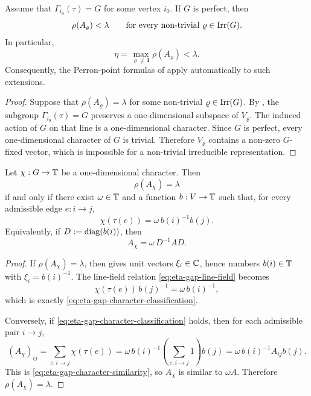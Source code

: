 \begin{corollary}
  \label{cor:eta-gap-perfect-group}
  Assume that \(\Gamma_{i_0}(\tau)=G\) for some vertex \(i_0\). If
  \(G\) is perfect, then
  \[
    \rho(A_\varrho)<\lambda
    \qquad
    \text{for every non-trivial } \varrho\in\operatorname{Irr}(G).
  \]
  In particular,
  \[
    \eta=\max_{\varrho\neq\mathbf 1}\rho(A_\varrho)<\lambda.
  \]
  Consequently, the Perron-point formulas of
   apply
  automatically to such extensions.
\end{corollary}

\begin{proof}
  Suppose that \(\rho(A_\varrho)=\lambda\) for some non-trivial
  \(\varrho\in\operatorname{Irr}(G)\). By , the subgroup
  \(\Gamma_{i_0}(\tau)=G\) preserves a one-dimensional subspace of
  \(V_\varrho\). The induced action of \(G\) on that line is a
  one-dimensional character. Since \(G\) is perfect, every
  one-dimensional character of \(G\) is trivial. Therefore
  \(V_\varrho\) contains a non-zero \(G\)-fixed vector, which is
  impossible for a non-trivial irreducible representation.
\end{proof}

\begin{corollary}
  \label{cor:eta-gap-character-classification}
  Let \(\chi:G\to\mathbb{T}\) be a one-dimensional character. Then
  \[
    \rho(A_\chi)=\lambda
  \]
  if and only if there exist \(\omega\in\mathbb{T}\) and a function
  \(b:V\to\mathbb{T}\) such that, for every admissible edge \(e:i\to j\),
  \begin{equation}\label{eq:eta-gap-character-classification}
    \chi(\tau(e))=\omega\,b(i)^{-1}b(j).
  \end{equation}
  Equivalently, if \(D:=\operatorname{diag}(b(i))\), then
  \begin{equation}\label{eq:eta-gap-character-similarity}
    A_\chi=\omega\,D^{-1}AD.
  \end{equation}
\end{corollary}

\begin{proof}
  If \(\rho(A_\chi)=\lambda\), then
   gives unit vectors
  \(\xi_i\in\mathbb{C}\), hence numbers \(b(i)\in\mathbb{T}\) with
  \(\xi_i=b(i)^{-1}\). The line-field relation
  \eqref{eq:eta-gap-line-field} becomes
  \[
    \chi(\tau(e))\,b(j)^{-1}=\omega\,b(i)^{-1},
  \]
  which is exactly \eqref{eq:eta-gap-character-classification}.

  Conversely, if \eqref{eq:eta-gap-character-classification} holds,
  then for each admissible pair \(i\to j\),
  \[
    (A_\chi)_{ij}
    =
    \sum_{e:i\to j}\chi(\tau(e))
    =
    \omega\,b(i)^{-1}
      \left(\sum_{e:i\to j}1\right)b(j)
    =
    \omega\,b(i)^{-1}A_{ij}b(j).
  \]
  This is \eqref{eq:eta-gap-character-similarity}, so \(A_\chi\) is
  similar to \(\omega A\). Therefore \(\rho(A_\chi)=\lambda\).
\end{proof}

